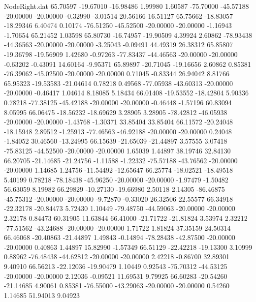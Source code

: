 \begin{filecontents}{NodeRight.dat}
  65.70597  -19.67010  -16.98486     1.99980    1.60587  -75.70000  -45.57188  -20.00000  -20.00000   -0.32990   -3.01514   20.56166   16.51127
  65.75662  -18.83057  -18.29346     6.40474    0.10174  -76.51250  -45.52500  -20.00000  -20.00000   -1.16943   -1.70654   65.21452    1.03598
  65.80730  -16.74957  -19.90509     4.39924    2.60862  -78.93438  -44.36563  -20.00000  -20.00000   -3.25043   -0.09491   44.49319   26.38312
  65.85807  -19.36798  -19.56909     1.42680   -0.97263  -77.83437  -44.46563  -20.00000  -20.00000   -0.63202   -0.43091   14.60164   -9.95371
  65.89897  -20.71045  -19.16656     2.60862    0.85381  -76.39062  -45.02500  -20.00000  -20.00000    0.71045   -0.83344   26.94042    8.81766
  65.95323  -19.53583  -21.04614     0.78218    0.49568  -77.05938  -43.60313  -20.00000  -20.00000   -0.46417    1.04614    8.18085    5.18434
  66.01408  -19.53552  -18.42804     5.90336    0.78218  -77.38125  -45.42188  -20.00000  -20.00000   -0.46448   -1.57196   60.83094    8.05995
  66.06475  -18.56232  -18.69629     3.28905    3.28905  -78.42812  -46.05938  -20.00000  -20.00000   -1.43768   -1.30371   33.85404   33.85404
  66.11572  -20.24048  -18.15948     2.89512   -1.25913  -77.46563  -46.92188  -20.00000  -20.00000    0.24048   -1.84052   30.46560  -13.24995
  66.15639  -21.65039  -21.44897     3.57555    3.07418  -75.83125  -44.52500  -20.00000  -20.00000    1.65039    1.44897   38.19746   32.84130
  66.20705  -21.14685  -21.24756    -1.11588   -1.22332  -75.57188  -43.76562  -20.00000  -20.00000    1.14685    1.24756  -11.54492  -12.65647
  66.25774  -18.02521  -18.49518     5.40199    0.78218  -78.18438  -45.96250  -20.00000  -20.00000   -1.97479   -1.50482   56.63059    8.19982
  66.29829  -10.27130  -19.66980     2.50118    2.14305  -86.46875  -45.75312  -20.00000  -20.00000   -9.72870   -0.33020   26.32506   22.55577
  66.34918  -22.32178  -20.84473     5.72430    1.10449  -79.48750  -44.59063  -20.00000  -20.00000    2.32178    0.84473   60.31905   11.63844
  66.41000  -21.71722  -21.81824     3.53974    2.32212  -77.51562  -43.24688  -20.00000  -20.00000    1.71722    1.81824   37.35159   24.50314
  66.46068  -20.40863  -21.44897     1.49843   -0.14894  -78.28438  -42.87500  -20.00000  -20.00000    0.40863    1.44897   15.82990   -1.57349
  66.51129  -22.42218  -19.13300     3.10999    0.88962  -76.48438  -44.62812  -20.00000  -20.00000    2.42218   -0.86700   32.89301    9.40910
  66.56213  -22.12036  -19.90479     1.10449    0.92543  -75.70312  -44.53125  -20.00000  -20.00000    2.12036   -0.09521   11.69531    9.79925
  66.60283  -20.54260  -21.14685     4.90061    0.85381  -76.55000  -43.29063  -20.00000  -20.00000    0.54260    1.14685   51.94013    9.04923

\end{filecontents}
